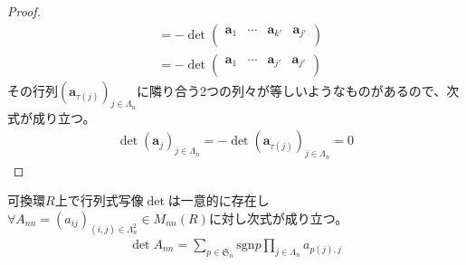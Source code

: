 \documentclass[dvipdfmx]{jsarticle}
\begin{document}
\begin{proof}
\begin{align*}
&= - \det\begin{pmatrix}
\mathbf{a}_{1} & \cdots & \mathbf{a}_{k'} & \mathbf{a}_{j'} \\
\end{pmatrix}\\
&= - \det\begin{pmatrix}
\mathbf{a}_{1} & \cdots & \mathbf{a}_{j'} & \mathbf{a}_{j'} \\
\end{pmatrix}
\end{align*}
その行列$\left( \mathbf{a}_{\tau(j)} \right)_{j \in \varLambda_{n}}$に隣り合う2つの列々が等しいようなものがあるので、次式が成り立つ。
\begin{align*}
\det\left( \mathbf{a}_{j} \right)_{j \in \varLambda_{n}} = - \det\left( \mathbf{a}_{\tau(j)} \right)_{j \in \varLambda_{n}} = 0
\end{align*}
\end{proof}
\begin{thm}[行列式写像の一意性]\label{2.1.11.5}
可換環$R$上で行列式写像$\det$は一意的に存在し$\forall A_{nn} = \left( a_{ij} \right)_{(i,j) \in \varLambda_{n}^{2}} \in M_{nn}(R)$に対し次式が成り立つ。
\begin{align*}
\det A_{nn} = \sum_{p \in \mathfrak{S}_{n}} {{\mathrm{sgn} }p\prod_{j \in \varLambda_{n}} a_{p(j),j}}
\end{align*}
\end{thm}
\end{document}
